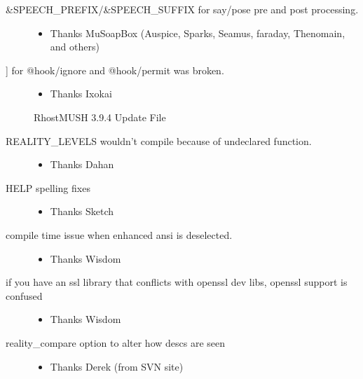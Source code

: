 \documentclass[letterpaper,10pt,english]{sphinxmanual}
\begin{document}
\begin{description}
\begin{itemize}
\end{itemize}

\item[{\&SPEECH\_PREFIX/\&SPEECH\_SUFFIX for say/pose pre and post processing.}] \leavevmode\begin{itemize}
\item {} 
\sphinxAtStartPar
Thanks MuSoapBox (Auspice, Sparks, Seamus, faraday, Thenomain, and others)

\end{itemize}

\item[{{]} for @hook/ignore and @hook/permit was broken.}] \leavevmode\begin{itemize}
\item {} 
\sphinxAtStartPar
Thanks Ixokai

\end{itemize}

\sphinxAtStartPar
RhostMUSH 3.9.4 Update File

\item[{REALITY\_LEVELS wouldn’t compile because of undeclared function.}] \leavevmode\begin{itemize}
\item {} 
\sphinxAtStartPar
Thanks Dahan

\end{itemize}

\item[{HELP spelling fixes}] \leavevmode\begin{itemize}
\item {} 
\sphinxAtStartPar
Thanks Sketch

\end{itemize}

\item[{compile time issue when enhanced ansi is deselected.}] \leavevmode\begin{itemize}
\item {} 
\sphinxAtStartPar
Thanks Wisdom

\end{itemize}

\item[{if you have an ssl library that conflicts with openssl dev libs, openssl support is confused}] \leavevmode\begin{itemize}
\item {} 
\sphinxAtStartPar
Thanks Wisdom

\end{itemize}

\item[{reality\_compare \textendash{} option to alter how descs are seen}] \leavevmode\begin{itemize}
\item {} 
\sphinxAtStartPar
Thanks Derek (from SVN site)


\end{itemize}
\end{description}
\end{document}
